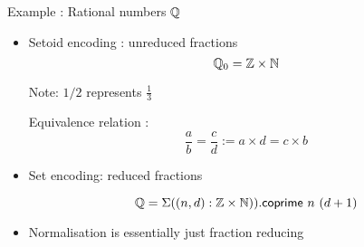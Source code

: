 \documentclass[11pt, mathserif,handout]{beamer}
\begin{document}
\begin{frame}[allowframebreaks,t]{Example : Rational numbers $\mathbb{Q}$}

\begin{itemize}

\item Setoid encoding : unreduced fractions $$\mathbb{Q}_0 = \mathbb{Z} \times \mathbb{N}$$

Note: $1/2$ represents $\frac{1}{3}$

Equivalence relation : $$ \frac{a}{b} = \frac{c}{d} := a \times d = c \times b $$


\item Set encoding: reduced fractions 

$$\mathbb{Q} = \Sigma ((n , d) : \mathbb{Z} \times \mathbb{N})). \mathsf{coprime} ~n ~(d +1)$$

\item Normalisation is essentially just fraction reducing


\end{itemize}
\end{frame}
\end{document}
